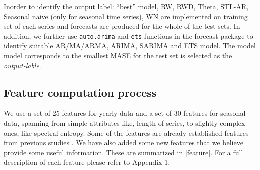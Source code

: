 \documentclass[11pt,a4paper,]{article}
\theoremstyle{definition}
\theoremstyle{definition}
\theoremstyle{definition}
\theoremstyle{remark}
\begin{document}
Inorder to identify the output label: ``best'' model, RW, RWD, Theta,
STL-AR, Seasonal naive (only for seasonal time series), WN are
implemented on training set of each series and forecasts are produced
for the whole of the test sets. In addition, we further use
\texttt{auto.arima} and \texttt{ets} functions in the forecast package
to identify suitable AR/MA/ARMA, ARIMA, SARIMA and ETS model. The model
model corresponds to the smallest MASE \autocite{hyndman2006another} for
the test set is selected as the \emph{output-lable}.

\subsection{Feature computation process}\label{sec:features}

We use a set of 25 features for yearly data and a set of 30 features for
seasonal data, spanning from simple attributes like, length of series,
to slightly complex ones, like spectral entropy. Some of the features
are already established features from previous studies
\autocites{wang2009rule}{hyndman2015large}{kang2017visualising}. We have
also added some new features that we believe provide some useful
information. These are summarized in \autoref{feature}. For a full
description of each feature please refer to Appendix 1.

\newcommand{\boxedcheckmark}
  {{\ooalign{$\Box$\cr\hidewidth$\checkmark$\hidewidth}}}
\end{document}
